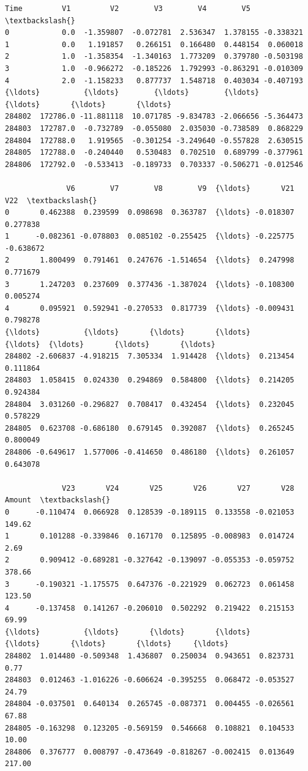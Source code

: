 \documentclass[11pt]{article}
\makeatletter
\newcommand{\boxspacing}{\kern\kvtcb@left@rule\kern\kvtcb@boxsep}
\newcommand{\prompt}[4]{
        {\ttfamily\llap{{\color{#2}[#3]:\hspace{3pt}#4}}\vspace{-\baselineskip}}
    }
\makeatother
\begin{document}
            \begin{tcolorbox}[breakable, size=fbox, boxrule=.5pt, pad at break*=1mm, opacityfill=0]
\prompt{Out}{outcolor}{3}{\boxspacing}
\begin{Verbatim}[commandchars=\\\{\}]
            Time         V1         V2        V3        V4        V5  \textbackslash{}
0            0.0  -1.359807  -0.072781  2.536347  1.378155 -0.338321
1            0.0   1.191857   0.266151  0.166480  0.448154  0.060018
2            1.0  -1.358354  -1.340163  1.773209  0.379780 -0.503198
3            1.0  -0.966272  -0.185226  1.792993 -0.863291 -0.010309
4            2.0  -1.158233   0.877737  1.548718  0.403034 -0.407193
{\ldots}          {\ldots}        {\ldots}        {\ldots}       {\ldots}       {\ldots}       {\ldots}
284802  172786.0 -11.881118  10.071785 -9.834783 -2.066656 -5.364473
284803  172787.0  -0.732789  -0.055080  2.035030 -0.738589  0.868229
284804  172788.0   1.919565  -0.301254 -3.249640 -0.557828  2.630515
284805  172788.0  -0.240440   0.530483  0.702510  0.689799 -0.377961
284806  172792.0  -0.533413  -0.189733  0.703337 -0.506271 -0.012546

              V6        V7        V8        V9  {\ldots}       V21       V22  \textbackslash{}
0       0.462388  0.239599  0.098698  0.363787  {\ldots} -0.018307  0.277838
1      -0.082361 -0.078803  0.085102 -0.255425  {\ldots} -0.225775 -0.638672
2       1.800499  0.791461  0.247676 -1.514654  {\ldots}  0.247998  0.771679
3       1.247203  0.237609  0.377436 -1.387024  {\ldots} -0.108300  0.005274
4       0.095921  0.592941 -0.270533  0.817739  {\ldots} -0.009431  0.798278
{\ldots}          {\ldots}       {\ldots}       {\ldots}       {\ldots}  {\ldots}       {\ldots}       {\ldots}
284802 -2.606837 -4.918215  7.305334  1.914428  {\ldots}  0.213454  0.111864
284803  1.058415  0.024330  0.294869  0.584800  {\ldots}  0.214205  0.924384
284804  3.031260 -0.296827  0.708417  0.432454  {\ldots}  0.232045  0.578229
284805  0.623708 -0.686180  0.679145  0.392087  {\ldots}  0.265245  0.800049
284806 -0.649617  1.577006 -0.414650  0.486180  {\ldots}  0.261057  0.643078

             V23       V24       V25       V26       V27       V28  Amount  \textbackslash{}
0      -0.110474  0.066928  0.128539 -0.189115  0.133558 -0.021053  149.62
1       0.101288 -0.339846  0.167170  0.125895 -0.008983  0.014724    2.69
2       0.909412 -0.689281 -0.327642 -0.139097 -0.055353 -0.059752  378.66
3      -0.190321 -1.175575  0.647376 -0.221929  0.062723  0.061458  123.50
4      -0.137458  0.141267 -0.206010  0.502292  0.219422  0.215153   69.99
{\ldots}          {\ldots}       {\ldots}       {\ldots}       {\ldots}       {\ldots}       {\ldots}     {\ldots}
284802  1.014480 -0.509348  1.436807  0.250034  0.943651  0.823731    0.77
284803  0.012463 -1.016226 -0.606624 -0.395255  0.068472 -0.053527   24.79
284804 -0.037501  0.640134  0.265745 -0.087371  0.004455 -0.026561   67.88
284805 -0.163298  0.123205 -0.569159  0.546668  0.108821  0.104533   10.00
284806  0.376777  0.008797 -0.473649 -0.818267 -0.002415  0.013649  217.00


\end{Verbatim}
\end{tcolorbox}
\end{document}
